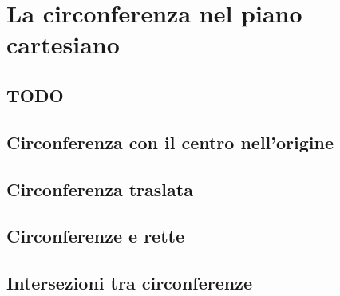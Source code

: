 
\chapter{La circonferenza nel piano cartesiano}

\section{TODO}

\section{Circonferenza con il centro nell'origine}
\label{sec:01_corccentroorigine}

% 

\section{Circonferenza traslata}
\label{sec:02_circtraslata}

\section{Circonferenze e rette}
\label{sec:03_circrette}

\section{Intersezioni tra circonferenze}
\label{sec:04_intersezionitracirc}



